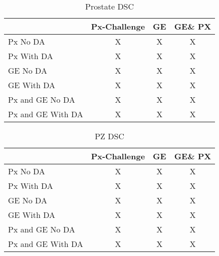 \begin{table}
    \centering
    \begin{tabular}{|l|c|c|c|}
        \hline
         & Px-Challenge & GE & GE\& PX \\
         \hline
         Px No DA & X & X & X \\
         Px With DA & X & X & X \\
         \hline
         GE No DA & X & X & X \\
         GE With DA & X & X & X \\
         \hline
         Px and GE No DA & X & X & X \\
         Px and GE With DA & X & X & X \\
         \hline
    \end{tabular}
    \caption{Prostate DSC}
    \label{tab:res_prost}
\end{table}


\begin{table}
    \centering
    \begin{tabular}{|l|c|c|c|}
        \hline
         & Px-Challenge & GE & GE\& PX \\
         \hline
         Px No DA & X & X & X \\
         Px With DA & X & X & X \\
         \hline
         GE No DA & X & X & X \\
         GE With DA & X & X & X \\
         \hline
         Px and GE No DA & X & X & X \\
         Px and GE With DA & X & X & X \\
         \hline
    \end{tabular}
    \caption{PZ DSC}
    \label{tab:res_pz}
\end{table}
